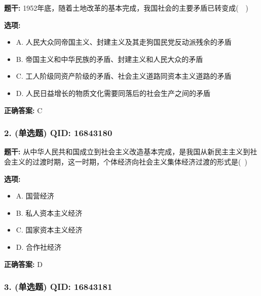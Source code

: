 \documentclass[12pt,UTF8]{ctexart}
\begin{document}
\textbf{题干:}
1952年底，随着土地改革的基本完成，我国社会的主要矛盾已转变成(  )

\textbf{选项:}
\begin{itemize}[leftmargin=*]

  \item A. 人民大众同帝国主义、封建主义及其走狗国民党反动派残余的矛盾

  \item B. 帝国主义和中华民族的矛盾、封建主义和人民大众的矛盾

  \item C. 工人阶级同资产阶级的矛盾、社会主义道路同资本主义道路的矛盾

  \item D. 人民日益增长的物质文化需要同落后的社会生产之间的矛盾

\end{itemize}

\textbf{正确答案:}
C

\vspace{0.3em}\hrulefill\vspace{0.7em}

\subsubsection*{2. (单选题) \small QID: 16843180}

\textbf{题干:}
从中华人民共和国成立到社会主义改造基本完成，是我国从新民主主义到社会主义的过渡时期，这一时期，个体经济向社会主义集体经济过渡的形式是( )

\textbf{选项:}
\begin{itemize}[leftmargin=*]

  \item A. 国营经济

  \item B. 私人资本主义经济

  \item C. 国家资本主义经济

  \item D. 合作社经济

\end{itemize}

\textbf{正确答案:}
D

\vspace{0.3em}\hrulefill\vspace{0.7em}

\subsubsection*{3. (单选题) \small QID: 16843181}
\end{document}
